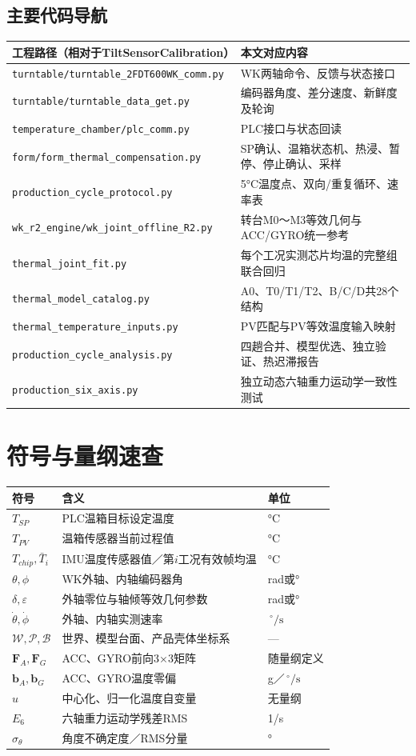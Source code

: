 \documentclass[UTF8,a4paper,11pt,oneside,openany,fontset=none]{ctexbook}
\newcommand{\vct}[1]{\bm{#1}}
\newcommand{\mat}[1]{\mathbf{#1}}
\newcommand{\dps}{\,^{\circ}/\mathrm s}
\begin{document}
\section{主要代码导航}
\begin{longtable}{p{8.3cm}p{6.95cm}}\toprule
工程路径（相对于TiltSensorCalibration） & 本文对应内容\\\midrule\endhead
\texttt{turntable/turntable\_2FDT600WK\_comm.py} & WK两轴命令、反馈与状态接口\\
\texttt{turntable/turntable\_data\_get.py} & 编码器角度、差分速度、新鲜度及轮询\\
\texttt{temperature\_chamber/plc\_comm.py} & PLC接口与状态回读\\
\texttt{form/form\_thermal\_compensation.py} & SP确认、温箱状态机、热浸、暂停、停止确认、采样\\
\texttt{production\_cycle\_protocol.py} & 5°C温度点、双向/重复循环、速率表\\
\texttt{wk\_r2\_engine/wk\_joint\_offline\_R2.py} & 转台M0～M3等效几何与ACC/GYRO统一参考\\
\texttt{thermal\_joint\_fit.py} & 每个工况实测芯片均温的完整组联合回归\\
\texttt{thermal\_model\_catalog.py} & A0、T0/T1/T2、B/C/D共28个结构\\
\texttt{thermal\_temperature\_inputs.py} & PV匹配与PV等效温度输入映射\\
\texttt{production\_cycle\_analysis.py} & 四趟合并、模型优选、独立验证、热迟滞报告\\
\texttt{production\_six\_axis.py} & 独立动态六轴重力运动学一致性测试\\\bottomrule
\end{longtable}

\chapter{符号与量纲速查}
\begin{longtable}{p{3.2cm}p{7.8cm}p{2.0cm}}\toprule
符号 & 含义 & 单位\\\midrule\endhead
$T_{SP}$ & PLC温箱目标设定温度 & °C\\
$T_{PV}$ & 温箱传感器当前过程值 & °C\\
$T_{chip},\bar T_i$ & IMU温度传感器值／第$i$工况有效帧均温 & °C\\
$\theta,\phi$ & WK外轴、内轴编码器角 & rad或°\\
$\delta,\varepsilon$ & 外轴零位与轴倾等效几何参数 & rad或°\\
$\dot\theta,\dot\phi$ & 外轴、内轴实测速率 & $\dps$\\
$\mathcal W,\mathcal P,\mathcal B$ & 世界、模型台面、产品壳体坐标系 & —\\
$\mat F_A,\mat F_G$ & ACC、GYRO前向3×3矩阵 & 随量纲定义\\
$\vct b_A,\vct b_G$ & ACC、GYRO温度零偏 & g／$\dps$\\
$u$ & 中心化、归一化温度自变量 & 无量纲\\
$E_6$ & 六轴重力运动学残差RMS & 1/s\\
$\sigma_{\theta}$ & 角度不确定度／RMS分量 & °\\
\bottomrule
\end{longtable}
\end{document}
